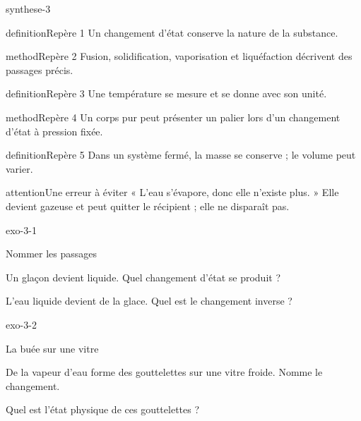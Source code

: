 \documentclass[12pt,twoside,openany]{book}
\begin{document}
\label{ch-3-bilan}
\begin{pcFiche}{synthese-3}
\begin{pcEncadre}{definition}{Repère 1}
Un changement d’état conserve la nature de la substance.\par
\end{pcEncadre}
\begin{pcEncadre}{method}{Repère 2}
Fusion, solidification, vaporisation et liquéfaction décrivent des passages précis.\par
\end{pcEncadre}
\begin{pcEncadre}{definition}{Repère 3}
Une température se mesure et se donne avec son unité.\par
\end{pcEncadre}
\begin{pcEncadre}{method}{Repère 4}
Un corps pur peut présenter un palier lors d’un changement d’état à pression fixée.\par
\end{pcEncadre}
\begin{pcEncadre}{definition}{Repère 5}
Dans un système fermé, la masse se conserve ; le volume peut varier.\par
\end{pcEncadre}
\begin{pcEncadre}{attention}{Une erreur à éviter}
« L’eau s’évapore, donc elle n’existe plus. » Elle devient gazeuse et peut quitter le récipient ; elle ne disparaît pas.\par
\end{pcEncadre}
\end{pcFiche}
\clearpage{}
\begin{blocLivre}{exo-3-1}
\begin{exercice}[1]{Nommer les passages}
\begin{questions}
\item Un glaçon devient liquide. Quel changement d’état se produit ?
\item L’eau liquide devient de la glace. Quel est le changement inverse ?
\end{questions}
\end{exercice}\end{blocLivre}
\begin{blocLivre}{exo-3-2}
\begin{exercice}[1]{La buée sur une vitre}
\begin{questions}
\item De la vapeur d’eau forme des gouttelettes sur une vitre froide. Nomme le changement.
\item Quel est l’état physique de ces gouttelettes ?
\end{questions}
\end{exercice}\end{blocLivre}
\end{document}
